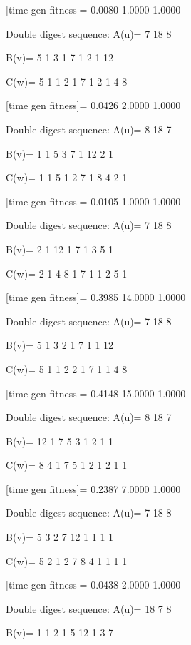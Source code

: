 [time gen fitness]=
    0.0080    1.0000    1.0000

Double digest sequence:
A(u)=
     7    18     8

B(v)=
     5     1     3     1     7     1     2     1    12

C(w)=
     5     1     1     2     1     7     1     2     1     4     8

[time gen fitness]=
    0.0426    2.0000    1.0000

Double digest sequence:
A(u)=
     8    18     7

B(v)=
     1     1     5     3     7     1    12     2     1

C(w)=
     1     1     5     1     2     7     1     8     4     2     1

[time gen fitness]=
    0.0105    1.0000    1.0000

Double digest sequence:
A(u)=
     7    18     8

B(v)=
     2     1    12     1     7     1     3     5     1

C(w)=
     2     1     4     8     1     7     1     1     2     5     1

[time gen fitness]=
    0.3985   14.0000    1.0000

Double digest sequence:
A(u)=
     7    18     8

B(v)=
     5     1     3     2     1     7     1     1    12

C(w)=
     5     1     1     2     2     1     7     1     1     4     8

[time gen fitness]=
    0.4148   15.0000    1.0000

Double digest sequence:
A(u)=
     8    18     7

B(v)=
    12     1     7     5     3     1     2     1     1

C(w)=
     8     4     1     7     5     1     2     1     2     1     1

[time gen fitness]=
    0.2387    7.0000    1.0000

Double digest sequence:
A(u)=
     7    18     8

B(v)=
     5     3     2     7    12     1     1     1     1

C(w)=
     5     2     1     2     7     8     4     1     1     1     1

[time gen fitness]=
    0.0438    2.0000    1.0000

Double digest sequence:
A(u)=
    18     7     8

B(v)=
     1     1     2     1     5    12     1     3     7

